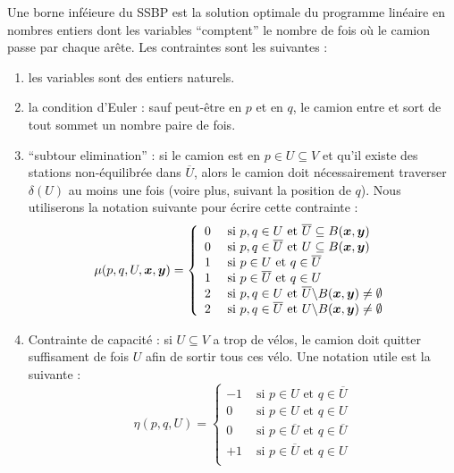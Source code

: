 Une borne inféieure du SSBP est la solution optimale du programme linéaire en nombres entiers dont les variables ``comptent'' le nombre de fois où le camion passe par chaque arête. Les contraintes sont les suivantes :
\begin{enumerate}[label=(\roman*)]
\item les variables sont des entiers naturels.
\item la condition d'Euler : sauf peut-être en $p$ et en $q$, le camion entre et sort de tout sommet un nombre paire de fois.
\item ``subtour elimination'' : si le camion est en $p \in U \subseteq V $ et qu'il existe des stations non-équilibrée dans $\overline{U}$, alors le camion doit nécessairement traverser $\delta(U)$ au moins une fois (voire plus, suivant la position de $q$). Nous utiliserons la notation suivante pour écrire cette contrainte :
\[
\mu(p,q,U,\boldsymbol{x},\boldsymbol{y}) = \left\{
\begin{array}{ll}
  0 &\mbox{ si } p,q \in U            \mbox{ et } \overline{U} \subseteq B(\boldsymbol{x},\boldsymbol{y})\\
  0 &\mbox{ si } p,q \in \overline{U} \mbox{ et } U \subseteq B(\boldsymbol{x},\boldsymbol{y})\\
  1 &\mbox{ si } p \in U              \mbox{ et } q \in \overline{U}\\
  1 &\mbox{ si } p \in \overline{U}   \mbox{ et } q \in U\\
  2 &\mbox{ si } p,q \in U            \mbox{ et } \overline{U} \backslash B(\boldsymbol{x},\boldsymbol{y}) \ne \emptyset\\
  2 &\mbox{ si } p,q \in \overline{U} \mbox{ et } U \backslash B(\boldsymbol{x},\boldsymbol{y}) \ne \emptyset
\end{array}
\right.
\]
\item Contrainte de capacité : si $U \subseteq V$ a trop de vélos, le camion doit quitter suffisament de fois $U$ afin de sortir tous ces vélo. Une notation utile est la suivante :
\[
\eta(p,q,U) = \left\{
\begin{array}{ll}
  -1 &\mbox{ si } p \in U            \mbox{ et } q \in \overline{U}\\
  0  &\mbox{ si } p \in U            \mbox{ et } q \in U\\
  0  &\mbox{ si } p \in \overline{U} \mbox{ et } q \in \overline{U}\\
  +1 &\mbox{ si } p \in \overline{U} \mbox{ et } q \in U\\
\end{array}
\right.
\]
\end{enumerate}

